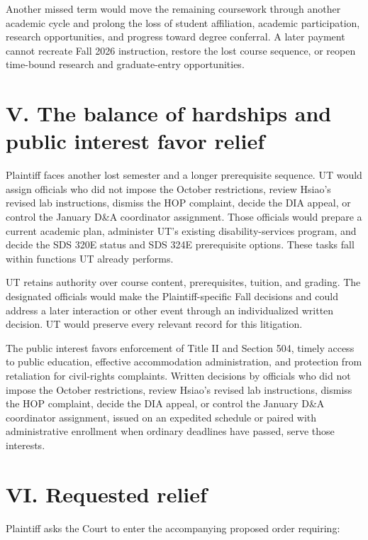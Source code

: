 \documentclass[12pt]{article}
\begin{document}
Another missed term would move the remaining coursework through another academic cycle and prolong the loss of student affiliation, academic participation, research opportunities, and progress toward degree conferral. A later payment cannot recreate Fall 2026 instruction, restore the lost course sequence, or reopen time-bound research and graduate-entry opportunities.
 
\section*{V. The balance of hardships and public interest favor relief}
 
Plaintiff faces another lost semester and a longer prerequisite sequence. UT would assign officials who did not impose the October restrictions, review Hsiao's revised lab instructions, dismiss the HOP complaint, decide the DIA appeal, or control the January D\&A coordinator assignment. Those officials would prepare a current academic plan, administer UT's existing disability-services program, and decide the SDS 320E status and SDS 324E prerequisite options. These tasks fall within functions UT already performs.
 
UT retains authority over course content, prerequisites, tuition, and grading. The designated officials would make the Plaintiff-specific Fall decisions and could address a later interaction or other event through an individualized written decision. UT would preserve every relevant record for this litigation.
 
The public interest favors enforcement of Title II and Section 504, timely access to public education, effective accommodation administration, and protection from retaliation for civil-rights complaints. Written decisions by officials who did not impose the October restrictions, review Hsiao's revised lab instructions, dismiss the HOP complaint, decide the DIA appeal, or control the January D\&A coordinator assignment, issued on an expedited schedule or paired with administrative enrollment when ordinary deadlines have passed, serve those interests.
 
\section*{VI. Requested relief}
 
Plaintiff asks the Court to enter the accompanying proposed order requiring:
 
\end{document}
